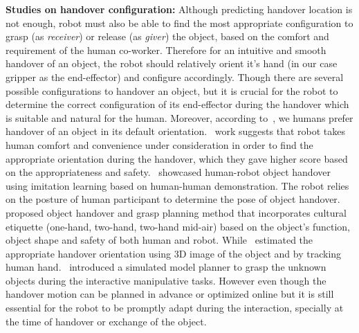 \textbf{Studies on handover configuration:} Although predicting handover location is not enough, robot must also be able to find the most appropriate configuration to grasp (as \textit{receiver}) or release (as \textit{giver}) the object, based on the comfort and requirement of the human co-worker. Therefore for an intuitive and smooth handover of an object, the robot should relatively orient it's hand (in our case gripper as the end-effector) and configure accordingly. Though there are several possible configurations to handover an object, but it is crucial for the robot to determine the correct configuration of its end-effector during the handover which is suitable and natural for the human. Moreover, according to~\cite{cakmak2011human}, we humans prefer handover of an object in its default orientation.~\cite{aleotti2012comfortable} work suggests that robot takes human comfort and convenience under consideration in order to find the appropriate orientation during the handover, which they gave higher score based on the appropriateness and safety.~\cite{vogt2018one} showcased human-robot object handover using imitation learning based on human-human demonstration. The robot relies on the posture of human participant to determine the pose of object handover. ~\cite{kim2004advanced} proposed object handover and grasp planning method that incorporates cultural etiquette (one-hand, two-hand, two-hand mid-air) based on the object's function, object shape and safety of both human and robot. While~\cite{vezzani2017novel, song2013predicting, micelli2011perception} estimated the appropriate handover orientation using 3D image of the object and by tracking human hand.~\cite{lopez2006grasp} introduced a simulated model planner to grasp the unknown objects during the interactive manipulative tasks. However even though the handover motion can be planned in advance or optimized online but it is still essential for the robot to be promptly adapt during the interaction, specially at the time of handover or exchange of the object.

